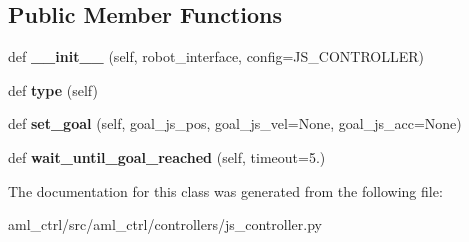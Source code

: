 \subsection*{Public Member Functions}
\begin{DoxyCompactItemize}
\item 
\hypertarget{classaml__ctrl_1_1controllers_1_1js__controller_1_1_j_s_controller_a20c860ccfc1fa0c885fa70b7c8dd3ab7}{}\label{classaml__ctrl_1_1controllers_1_1js__controller_1_1_j_s_controller_a20c860ccfc1fa0c885fa70b7c8dd3ab7} 
def {\bfseries \+\_\+\+\_\+init\+\_\+\+\_\+} (self, robot\+\_\+interface, config=J\+S\+\_\+\+C\+O\+N\+T\+R\+O\+L\+L\+ER)
\item 
\hypertarget{classaml__ctrl_1_1controllers_1_1js__controller_1_1_j_s_controller_a4efdcf09041134132da8a3af960233ab}{}\label{classaml__ctrl_1_1controllers_1_1js__controller_1_1_j_s_controller_a4efdcf09041134132da8a3af960233ab} 
def {\bfseries type} (self)
\item 
\hypertarget{classaml__ctrl_1_1controllers_1_1js__controller_1_1_j_s_controller_a2af7fcb70be78d9a8d341c72b1e4c7e7}{}\label{classaml__ctrl_1_1controllers_1_1js__controller_1_1_j_s_controller_a2af7fcb70be78d9a8d341c72b1e4c7e7} 
def {\bfseries set\+\_\+goal} (self, goal\+\_\+js\+\_\+pos, goal\+\_\+js\+\_\+vel=None, goal\+\_\+js\+\_\+acc=None)
\item 
\hypertarget{classaml__ctrl_1_1controllers_1_1js__controller_1_1_j_s_controller_a401d32f56f9ec362759b510b7b0c9201}{}\label{classaml__ctrl_1_1controllers_1_1js__controller_1_1_j_s_controller_a401d32f56f9ec362759b510b7b0c9201} 
def {\bfseries wait\+\_\+until\+\_\+goal\+\_\+reached} (self, timeout=5.)
\end{DoxyCompactItemize}


The documentation for this class was generated from the following file\+:\begin{DoxyCompactItemize}
\item 
aml\+\_\+ctrl/src/aml\+\_\+ctrl/controllers/js\+\_\+controller.\+py\end{DoxyCompactItemize}
